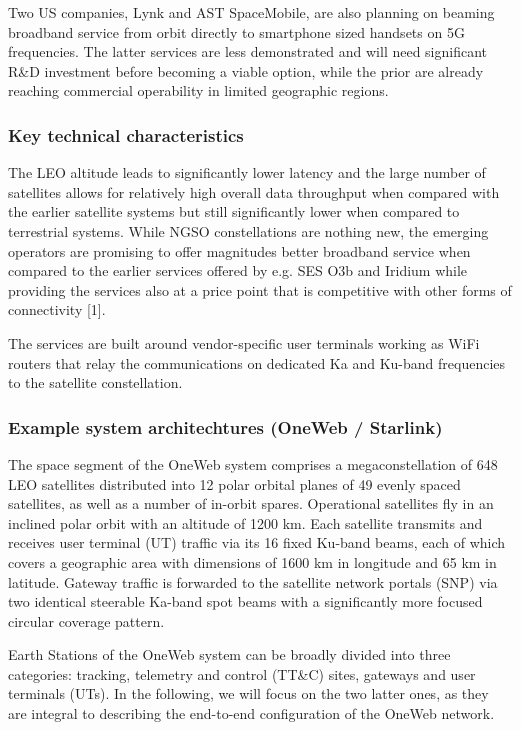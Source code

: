 \documentclass[english, 12pt, a4paper, elec, utf8, a-1b, online]{aaltothesis}
\begin{document}
Two US companies, Lynk and AST SpaceMobile, are also planning on beaming broadband service from orbit directly to smartphone sized handsets on 5G frequencies. The latter services are less demonstrated and will need significant R\&D investment before becoming a viable option, while the prior are already reaching commercial operability in limited geographic regions.

\subsubsection{Key technical characteristics}
The LEO altitude leads to significantly lower latency and the large number of satellites allows for relatively high overall data throughput when compared with the earlier satellite systems but still significantly lower when compared to terrestrial systems. While NGSO constellations are nothing new, the emerging operators are promising to offer magnitudes better broadband service when compared to the earlier services offered by e.g. SES O3b and Iridium while providing the services also at a price point that is competitive with other forms of connectivity [1].

The services are built around vendor-specific user terminals working as WiFi routers that relay the communications on dedicated Ka and Ku-band frequencies to the satellite constellation.

\subsubsection{Example system architechtures (OneWeb / Starlink)}
The space segment of the OneWeb system comprises a megaconstellation of 648 LEO satellites distributed into 12 polar orbital planes of 49 evenly spaced satellites, as well as a number of in-orbit spares. Operational satellites fly in an inclined polar orbit with an altitude of 1200 km. Each satellite transmits and receives user terminal (UT) traffic via its 16 fixed Ku-band beams, each of which covers a geographic area with dimensions of 1600 km in longitude and 65 km in latitude. Gateway traffic is forwarded to the satellite network portals (SNP) via two identical steerable Ka-band spot beams with a significantly more focused circular coverage pattern. \cite{henri2020oneweb, worldvu2016loi}

Earth Stations of the OneWeb system can be broadly divided into three categories: tracking, telemetry and control (TT\&C) sites,  gateways and user terminals (UTs). In the following, we will focus on the two latter ones, as they are integral to describing the end-to-end configuration of the OneWeb network. \cite{worldvu2016loi}
\end{document}
